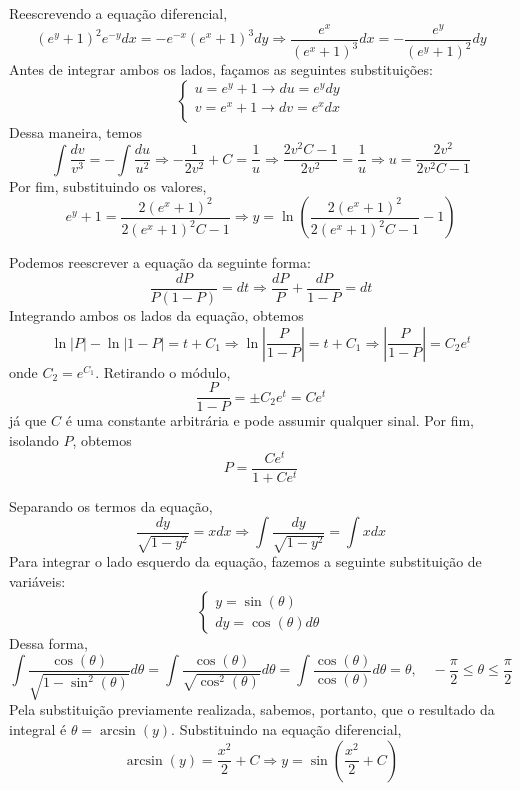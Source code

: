 \documentclass[oneside,12pt,a4paper]{report}
\begin{document}
\begin{resolucao}
        \itemresolucao Reescrevendo a equação diferencial,
        \[(e^y+1)^2e^{-y}dx=-e^{-x}(e^x+1)^3dy\Rightarrow\frac{e^x}{(e^x+1)^3}dx=-\frac{e^y}{(e^y+1)^2}dy\]
        Antes de integrar ambos os lados, façamos as seguintes substituições:
        \[\begin{cases}
            u=e^y+1\rightarrow du=e^ydy\\
            v=e^x+1\rightarrow dv=e^xdx\\
        \end{cases}\]
        Dessa maneira, temos
        \[\int\frac{dv}{v^3}=-\int\frac{du}{u^2}\Rightarrow-\frac{1}{2v^2}+C=\frac{1}{u}\Rightarrow\frac{2v^2C-1}{2v^2}=\frac{1}{u}\Rightarrow u=\frac{2v^2}{2v^2C-1}\]
        Por fim, substituindo os valores,
        \[e^y+1=\frac{2(e^x+1)^2}{2(e^x+1)^2C-1}\Rightarrow\boxed{y=\ln\left(\frac{2(e^x+1)^2}{2(e^x+1)^2C-1}-1\right)}\]

        \itemresolucao Podemos reescrever a equação da seguinte forma: \[\frac{dP}{P(1-P)}=dt\Rightarrow\frac{dP}{P}+\frac{dP}{1-P}=dt\]
        Integrando ambos os lados da equação, obtemos
        \[\ln|P|-\ln|1-P|=t+C_1\Rightarrow\ln\left|\frac{P}{1-P}\right|=t+C_1\Rightarrow\left|\frac{P}{1-P}\right|=C_2e^t\]
        onde $C_2=e^{C_1}$. Retirando o módulo,
        \[\frac{P}{1-P}=\pm C_2e^t=Ce^t\]
        já que $C$ é uma constante arbitrária e pode assumir qualquer sinal. Por fim, isolando $P$, obtemos
        \[\boxed{P=\frac{Ce^t}{1+Ce^t}}\]

        \itemresolucao Separando os termos da equação,
        \[\frac{dy}{\sqrt{1-y^2}}=xdx\Rightarrow\int\frac{dy}{\sqrt{1-y^2}}=\int xdx\]
        Para integrar o lado esquerdo da equação, fazemos a seguinte substituição de variáveis:
        \[\begin{cases}
            y=\sin(\theta)\\
            dy=\cos(\theta)d\theta
        \end{cases}\]
        Dessa forma,
        \[\int \frac{\cos(\theta)}{\sqrt{1-\sin^2(\theta)}}d\theta=\int \frac{\cos(\theta)}{\sqrt{\cos^2(\theta)}}d\theta=\int \frac{\cos(\theta)}{\cos(\theta)}d\theta=\theta,\quad-\frac{\pi}{2}\leq\theta\leq\frac{\pi}{2}\]
        Pela substituição previamente realizada, sabemos, portanto, que o resultado da integral é $\theta=\arcsin(y)$. Substituindo na equação diferencial,
        \[\arcsin(y)=\frac{x^2}{2}+C\Rightarrow \boxed{y=\sin\left(\frac{x^2}{2}+C\right)}\]

    \end{resolucao}
\end{document}
